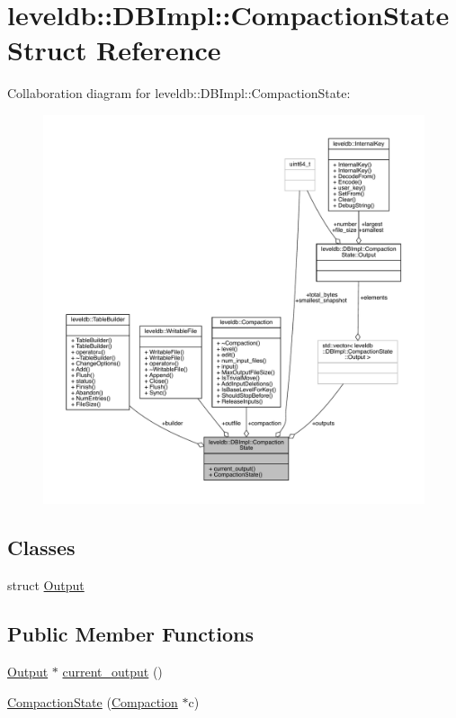 \hypertarget{structleveldb_1_1_d_b_impl_1_1_compaction_state}{}\section{leveldb\+::D\+B\+Impl\+::Compaction\+State Struct Reference}
\label{structleveldb_1_1_d_b_impl_1_1_compaction_state}


Collaboration diagram for leveldb\+::D\+B\+Impl\+::Compaction\+State\+:
\nopagebreak
\begin{figure}[H]
\begin{center}
\leavevmode
\includegraphics[width=350pt]{structleveldb_1_1_d_b_impl_1_1_compaction_state__coll__graph}
\end{center}
\end{figure}
\subsection*{Classes}
\begin{DoxyCompactItemize}
\item 
struct \mbox{\hyperlink{structleveldb_1_1_d_b_impl_1_1_compaction_state_1_1_output}{Output}}
\end{DoxyCompactItemize}
\subsection*{Public Member Functions}
\begin{DoxyCompactItemize}
\item 
\mbox{\hyperlink{structleveldb_1_1_d_b_impl_1_1_compaction_state_1_1_output}{Output}} $\ast$ \mbox{\hyperlink{structleveldb_1_1_d_b_impl_1_1_compaction_state_ac371d4a1422f4c1c122cfd39e97a6b95}{current\+\_\+output}} ()
\item 
\mbox{\hyperlink{structleveldb_1_1_d_b_impl_1_1_compaction_state_a3f66a31afd7f73ef5021337d1ec626b6}{Compaction\+State}} (\mbox{\hyperlink{classleveldb_1_1_compaction}{Compaction}} $\ast$c)
\end{DoxyCompactItemize}
